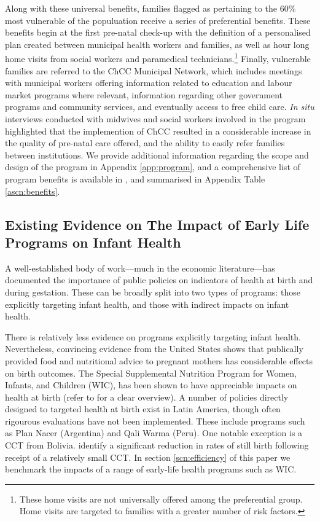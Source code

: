 \documentclass[12pt]{article}
\begin{document}
\begin{spacing}{1.4}
Along with these universal benefits, families flagged as 
pertaining to the 60\% most vulnerable of the populuation receive a
series of preferential benefits.  These benefits begin at the
first pre-natal check-up with the definition of a personalised
plan created between municipal health workers and families, as
well as hour long home visits from social workers and paramedical
technicians.\footnote{These home visits are not universally
  offered among the preferential group.  Home visits are targeted
  to families with a greater number of risk factors.} Finally,
vulnerable families are referred to the ChCC Municipal Network,
which includes meetings with municipal workers offering information
related to education and labour market programs where relevant,
information regarding other government programs and community
services, and eventually access to free child care. \emph{In situ}
interviews conducted with midwives and social workers involved in
the program highlighted that the implemention
of ChCC resulted in a considerable increase in the quality of
pre-natal care offered, and the ability to easily refer families
between institutions.  We provide additional information regarding
the scope and design of the program in Appendix \ref{app:program},
and a comprehensive list of program benefits is available in
\citet{MDS2014}, and summarised in Appendix Table \ref{ascn:benefits}.

\subsection{Existing Evidence on The Impact of Early Life Programs on Infant Health}
A well-established body of work---much in the economic
literature---has documented the importance of public policies
on indicators of health at birth and during gestation.  These
can be broadly split into two types of programs: those explicitly
targeting infant health, and those with indirect impacts on
infant health.

There is relatively less evidence on programs explicitly
targeting infant health. Nevertheless, convincing evidence
from the United States shows that publically provided food and
nutritional advice to pregnant mothers has considerable effects
on birth outcomes.  The Special Supplemental Nutrition Program
for Women, Infants, and Children (WIC), has been shown to have
appreciable impacts on health at birth (refer to
\citet{BitlerKaroly2015} for a clear overview).  A number of
policies directly designed to targeted health at birth exist
in Latin America, though often rigourous evaluations have not
been implemented. These include programs such as Plan Nacer
(Argentina) and Qali Warma (Peru).  One notable exception is
a CCT from Bolivia.  \citet{Celhayetal2016} identify a significant
reduction in rates of still birth following receipt of a relatively
small CCT.  In section \ref{scn:efficiency} of this paper we benchmark
the impacts of a range of early-life health programs such as WIC.


\end{spacing}
\end{document}
